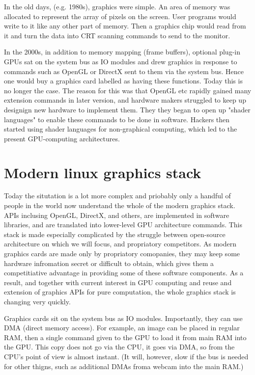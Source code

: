\documentclass[oneside,english]{scrbook}
\begin{document}
In the old days, (e.g. 1980s), graphics were simple.  An area of memory was allocated to represent the array of pixels on the screen. User programs would write to it like any other part of memory. Then a graphics chip would read from it and turn the data into CRT scanning commands to send to the monitor.

In the 2000s, in addition to memory mapping (frame buffers), optional plug-in GPUs sat on the system bus as IO modules and drew graphics in response to commands such as OpenGL or DirectX sent to them via the system bus. Hence one would buy a graphics card labelled as having these functions.   Today this is no longer the case.  The reason for this was that OpenGL etc rapidly gained many extension commands in later version, and hardware makers struggled to keep up designign new hardware to implement them. They they began to open up "shader languages" to enable these commands to be done in software.  Hackers then started using shader languages for non-graphical computing, which led to the present GPU-computing architectures.

\section{Modern linux graphics stack}


Today the situtation is a lot more complex and priobably only a handful of people in the world now understand the whole of the modern graphics stack. APIs inclusing OpenGL, DirectX, and others, are implemented in software libraries, and are translated into lower-level GPU architecture commands.   This stack is made especially complicated by the struggle between open-source architecture on which we will focus, and propriatory competitors.  As modern graphics cards are made only by propriatory comopanies, they may keep some hardware infromation secret or difficult to obtain, which gives them a competitiative advantage in providing some of these software components.  As a result, and together with current interest in GPU computing and reuse and extension of graphics APIs for pure computation, the whole graphics stack is changing very quickly.

Graphics cards sit on the system bus as IO modules.  Importantly, they can use DMA (direct memory access).  For example, an image can be placed in regular RAM, then a single command given to the GPU to load it from main RAM into the GPU.  This copy does not go via the CPU, it goes via DMA, so from the CPU's point of view is almost instant.  (It will, however, slow if the bus is needed for other thigns, such as additional DMAs froma  webcam into the main RAM.)
\end{document}

